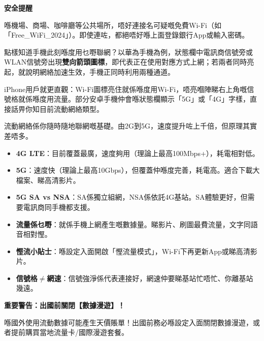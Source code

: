 \textbf{安全提醒}\par

喺機場、商場、咖啡廳等公共場所，唔好連接名可疑嘅免費Wi-Fi（如「Free\_WiFi\_2024」）。即使連咗，都絕唔好喺上面登錄銀行App或輸入密碼。


點樣知道手機此刻喺度用乜嘢聯網？以華為手機為例，狀態欄中電訊商信號旁或WLAN信號旁出現\textbf{雙向箭頭圖標}，即代表正在使用對應方式上網；若兩者同時亮起，就說明網絡加速生效，手機正同時利用兩種通道。

iPhone用戶就更直觀：Wi-Fi圖標亮住就係喺度用Wi-Fi，唔亮嗰陣睇右上角嘅信號格就係喺度用流量。部分安卓手機仲會喺狀態欄顯示「5G」或「4G」字樣，直接話畀你知目前流動網絡類型。


流動網絡係你隨時隨地聯網嘅基礎。由2G到5G，速度提升咗上千倍，但原理其實差唔多。


\begin{itemize}
  \item \textbf{4G LTE}：目前覆蓋最廣，速度夠用（理論上最高100Mbps+），耗電相對低。
  \item \textbf{5G}：速度快（理論上最高10Gbps），但覆蓋仲喺度完善，耗電高。適合下載大檔案、睇高清影片。
  \item \textbf{5G SA vs NSA}：SA係獨立組網，NSA係依託4G基站。SA體驗更好，但需要電訊商同手機都支援。
\end{itemize}


\begin{itemize}
  \item \textbf{流量係乜嘢}：就係手機上網產生嘅數據量。睇影片、刷圖最費流量，文字同語音相對慳。
  \item \textbf{慳流小貼士}：喺設定入面開啟「慳流量模式」，Wi-Fi下再更新App或睇高清影片。
  \item \textbf{信號格$\neq$網速}：信號強淨係代表連接好，網速仲要睇基站忙唔忙、你離基站幾遠。
\end{itemize}

\textbf{重要警告：出國前關閉【數據漫遊】！}\par

喺國外使用流動數據可能產生天價賬單！出國前務必喺設定入面關閉數據漫遊，或者提前購買當地流量卡/國際漫遊套餐。


